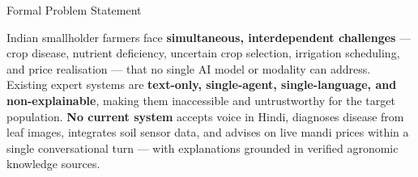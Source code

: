 \documentclass[aspectratio=169, 10pt]{beamer}
\begin{document}
\begin{frame}{Formal Problem Statement}
  \begin{tcolorbox}[psbox, top=4pt, bottom=4pt]
    \footnotesize Indian smallholder farmers face \textbf{simultaneous, interdependent challenges} --- crop disease, nutrient deficiency, uncertain crop selection, irrigation scheduling, and price realisation --- that no single AI model or modality can address. Existing expert systems are \textbf{text-only, single-agent, single-language, and non-explainable}, making them inaccessible and untrustworthy for the target population. \textbf{No current system} accepts voice in Hindi, diagnoses disease from leaf images, integrates soil sensor data, and advises on live mandi prices within a single conversational turn --- with explanations grounded in verified agronomic knowledge sources.
  \end{tcolorbox}


\end{frame}
\end{document}
